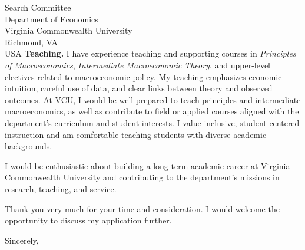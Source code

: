 \documentclass[11pt,letterpaper]{letter}
\begin{document}
\begin{letter}{Search Committee \\
Department of Economics \\
Virginia Commonwealth University \\
Richmond, VA \\ USA}
\textbf{Teaching.} I have experience teaching and supporting courses in \textit{Principles of Macroeconomics}, \textit{Intermediate Macroeconomic Theory}, and upper-level electives related to macroeconomic policy. My teaching emphasizes economic intuition, careful use of data, and clear links between theory and observed outcomes. At VCU, I would be well prepared to teach principles and intermediate macroeconomics, as well as contribute to field or applied courses aligned with the department’s curriculum and student interests. I value inclusive, student-centered instruction and am comfortable teaching students with diverse academic backgrounds.

I would be enthusiastic about building a long-term academic career at Virginia Commonwealth University and contributing to the department’s missions in research, teaching, and service.

Thank you very much for your time and consideration. I would welcome the opportunity to discuss my application further.

\closing{Sincerely,}

\end{letter}
\end{document}

